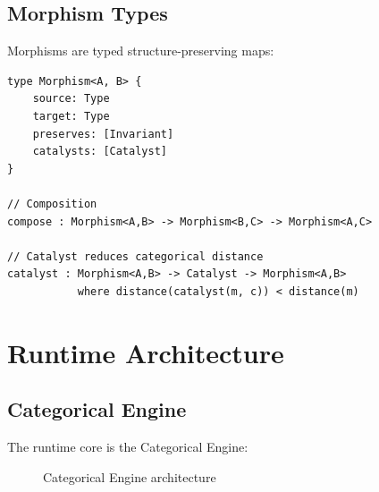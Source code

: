 \documentclass[twocolumn,10pt]{article}
\theoremstyle{remark}
\newcommand{\eps}{\varepsilon}
\begin{document}
\subsection{Morphism Types}

Morphisms are typed structure-preserving maps:

\begin{lstlisting}
type Morphism<A, B> {
    source: Type
    target: Type
    preserves: [Invariant]
    catalysts: [Catalyst]
}

// Composition
compose : Morphism<A,B> -> Morphism<B,C> -> Morphism<A,C>

// Catalyst reduces categorical distance
catalyst : Morphism<A,B> -> Catalyst -> Morphism<A,B>
           where distance(catalyst(m, c)) < distance(m)
\end{lstlisting}

\section{Runtime Architecture}
\label{sec:runtime}

\subsection{Categorical Engine}

The runtime core is the Categorical Engine:

\begin{figure}[H]
\centering
{}
\caption{Categorical Engine architecture}
\label{fig:engine}
\end{figure}
\end{document}
